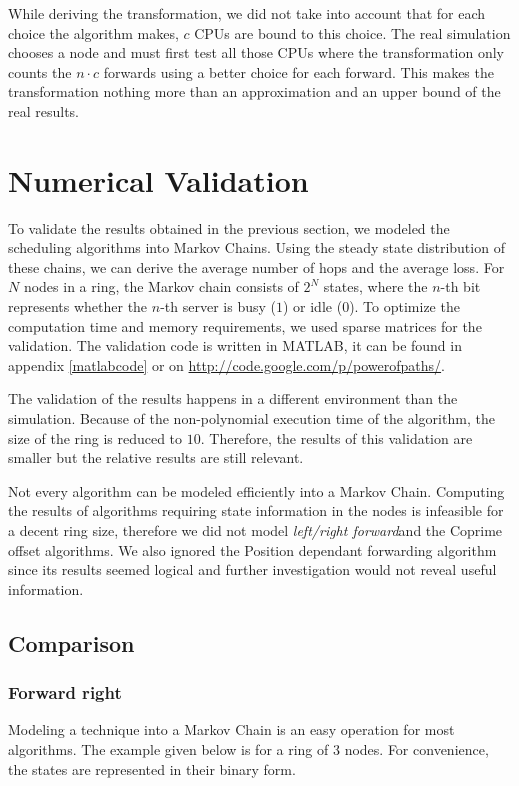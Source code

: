 \documentclass[10pt,a4paper]{article}
\newcommand{\LRF}{\textit{left/right forward\xspace}}
\begin{document}
While deriving the transformation, we did not take into account that for each choice the algorithm makes, $c$ CPUs are bound to this choice. The real simulation chooses a node and must first test all those CPUs where the transformation only counts the $n \cdot c$ forwards using a better choice for each forward. This makes the transformation nothing more than an approximation and an upper bound of the real results.

\section{Numerical Validation}
\label{secvalidation}

To validate the results obtained in the previous section, we modeled the scheduling algorithms into Markov Chains. Using the steady state distribution of these chains, we can derive the average number of hops and the average loss.
For $N$ nodes in a ring, the Markov chain consists of $2^N$ states, where the $n$-th bit represents whether the $n$-th server is busy ($1$) or idle ($0$). To optimize the computation time and memory requirements, we used sparse matrices for the validation. The validation code is written in MATLAB, it can be found in appendix \ref{matlabcode} or on \url{http://code.google.com/p/powerofpaths/}.

The validation of the results happens in a different environment than the simulation. Because of the non-polynomial execution time of the algorithm, the size of the ring is reduced to $10$. Therefore, the results of this validation are smaller but the relative results are still relevant.

Not every algorithm can be modeled efficiently into a Markov Chain. Computing the results of algorithms requiring state information in the nodes is infeasible for a decent ring size, therefore we did not model \LRF and the Coprime offset algorithms. We also ignored the Position dependant forwarding algorithm since its results seemed logical and further investigation would not reveal useful information.

\subsection{Comparison}
\subsubsection*{Forward right}
Modeling a technique into a Markov Chain is an easy operation for most algorithms. The example given below is for a ring of 3 nodes. For convenience, the states are represented in their binary form.
\end{document}
